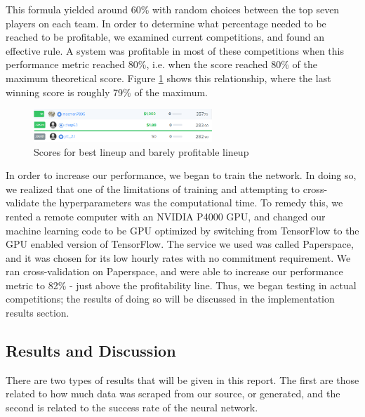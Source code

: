 This formula yielded around 60\% with random choices between the top seven players on each team. In order to determine what percentage needed to be reached to be profitable, we examined current competitions, and found an effective rule. A system was profitable in most of these competitions when this performance metric reached 80\%, i.e. when the score reached 80\% of the maximum theoretical score. Figure \ref{fig:80pRule} shows this relationship, where the last winning score is roughly 79\% of the maximum.
\begin{figure}[ht]
    \centering
    \includegraphics[width=0.6\textwidth]{figures/winningvslosing}
    \caption{Scores for best lineup and barely profitable lineup}
    \label{fig:80pRule}
\end{figure}
In order to increase our performance, we began to train the network. In doing so, we realized that one of the limitations of training and attempting to cross-validate the hyperparameters was the computational time. To remedy this, we rented a remote computer with an NVIDIA P4000 GPU, and changed our machine learning code to be GPU optimized by switching from TensorFlow to the GPU enabled version of TensorFlow. The service we used was called Paperspace, and it was chosen for its low hourly rates with no commitment requirement. We ran cross-validation on Paperspace, and were able to increase our performance metric to 82\% - just above the profitability line. Thus, we began testing in actual competitions; the results of doing so will be discussed in the implementation results section.

\subsection{Results and Discussion}
There are two types of results that will be given in this report. The first are those related to how much data was scraped from our source, or generated, and the second is related to the success rate of the neural network.

